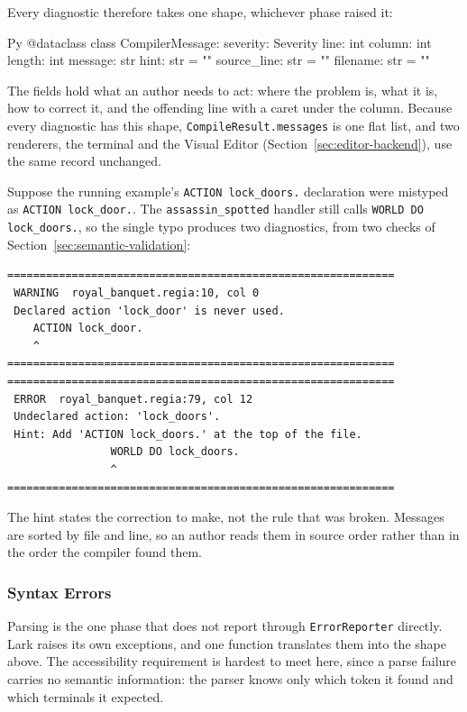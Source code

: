 Every diagnostic therefore takes one shape, whichever phase raised it:
 
\begin{codeblock}[]{Py}
@dataclass
class CompilerMessage:
    severity:    Severity
    line:        int
    column:      int
    length:      int
    message:     str
    hint:        str = ""
    source_line: str = ""
    filename:    str = ""
\end{codeblock}
 
The fields hold what an author needs to act: where the problem is, what it is, how to correct it, and the offending line with a caret under the column. Because every diagnostic has this shape, \lstinline|CompileResult.messages| is one flat list, and two renderers, the terminal and the Visual Editor (Section~\ref{sec:editor-backend}), use the same record unchanged.
 
Suppose the running example's \lstinline|ACTION lock_doors.| declaration were mistyped as \lstinline|ACTION lock_door.|. The \lstinline|assassin_spotted| handler still calls \lstinline|WORLD DO lock_doors.|, so the single typo produces two diagnostics, from two checks of Section~\ref{sec:semantic-validation}:
 
\begin{verbatim}
============================================================
 WARNING  royal_banquet.regia:10, col 0
 Declared action 'lock_door' is never used.
    ACTION lock_door.
    ^
============================================================
============================================================
 ERROR  royal_banquet.regia:79, col 12
 Undeclared action: 'lock_doors'.
 Hint: Add 'ACTION lock_doors.' at the top of the file.
                WORLD DO lock_doors.
                ^
============================================================
\end{verbatim}
 
The hint states the correction to make, not the rule that was broken. Messages are sorted by file and line, so an author reads them in source order rather than in the order the compiler found them.
 
\subsubsection{Syntax Errors}
 
Parsing is the one phase that does not report through \lstinline|ErrorReporter| directly. Lark raises its own exceptions, and one function translates them into the shape above. The accessibility requirement is hardest to meet here, since a parse failure carries no semantic information: the parser knows only which token it found and which terminals it expected.
 

